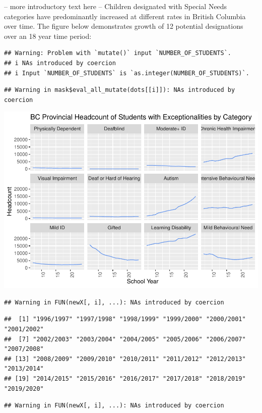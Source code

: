 \documentclass[
  english,
  man]{apa6}
\begin{document}
-- more introductory text here --
Children designated with Special Needs categories have predominantly increased at different rates in British Columbia over time. The figure below demonstrates growth of 12 potential designations over an 18 year time period:

\begin{verbatim}
## Warning: Problem with `mutate()` input `NUMBER_OF_STUDENTS`.
## i NAs introduced by coercion
## i Input `NUMBER_OF_STUDENTS` is `as.integer(NUMBER_OF_STUDENTS)`.
\end{verbatim}

\begin{verbatim}
## Warning in mask$eval_all_mutate(dots[[i]]): NAs introduced by coercion
\end{verbatim}

\includegraphics{draft_play_files/figure-latex/sandbox-1.pdf}

\begin{verbatim}
## Warning in FUN(newX[, i], ...): NAs introduced by coercion
\end{verbatim}

\begin{verbatim}
##  [1] "1996/1997" "1997/1998" "1998/1999" "1999/2000" "2000/2001" "2001/2002"
##  [7] "2002/2003" "2003/2004" "2004/2005" "2005/2006" "2006/2007" "2007/2008"
## [13] "2008/2009" "2009/2010" "2010/2011" "2011/2012" "2012/2013" "2013/2014"
## [19] "2014/2015" "2015/2016" "2016/2017" "2017/2018" "2018/2019" "2019/2020"
\end{verbatim}

\begin{verbatim}
## Warning in FUN(newX[, i], ...): NAs introduced by coercion
\end{verbatim}
\end{document}
